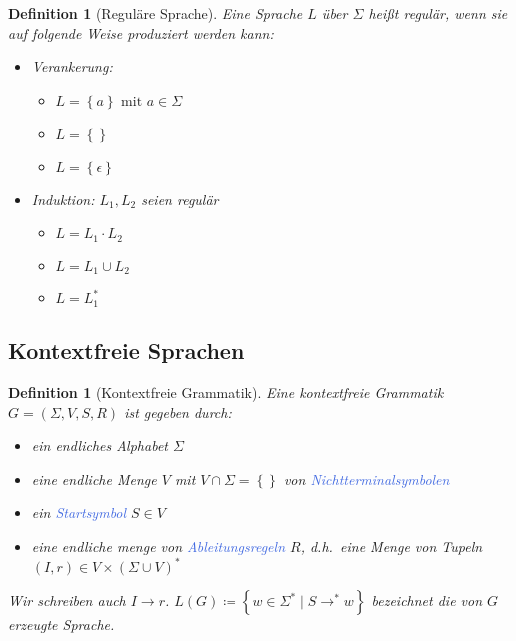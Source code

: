 \documentclass[11pt]{article}
\newcommand{\tcol}[1]{\textcolor{RoyalBlue}{#1}}
\newcommand{\set}[1]{\left\lbrace #1\right\rbrace}
\theoremstyle{break}
\newtheorem{defi}[satz]{Definition}
\begin{document}
    \begin{defi}[Reguläre Sprache]
        Eine Sprache $L$ über $\Sigma$ heißt regulär, wenn sie auf folgende Weise produziert werden kann:
        \begin{itemize}
            \item Verankerung:
            \begin{itemize}
                \item $L=\set{a}\text{ mit } a\in\Sigma$
                \item $L=\set{}$
                \item $L=\set{\epsilon}$
            \end{itemize}
            \item Induktion: $L_1,L_2$ seien regulär
            \begin{itemize}
                \item $L=L_1\cdot L_2$
                \item $L=L_1\cup L_2$
                \item $L=L_1^*$
            \end{itemize}
        \end{itemize}
    \end{defi}


    \subsection{Kontextfreie Sprachen}
	\label{subsec:kontextfreie-sprachenindex}

    \begin{defi}[Kontextfreie Grammatik]
        Eine kontextfreie Grammatik $G=(\Sigma ,V,S,R)$ ist gegeben durch:
        \begin{itemize}
            \item ein endliches Alphabet $\Sigma$
            \item eine endliche Menge $V$ mit $V\cap\Sigma = \set{}$ von \tcol{Nichtterminalsymbolen}
            \item ein \tcol{Startsymbol} $S\in V$
            \item eine endliche menge von \tcol{Ableitungsregeln} $R$, d.h.\ eine Menge von Tupeln $(I,r)\in V\times (\Sigma\cup V)^*$
        \end{itemize}
        Wir schreiben auch $I\rightarrow r$. $L(G)\coloneqq \set{w\in\Sigma^*\mid S\rightarrow^*w}$ bezeichnet die von $G$ erzeugte Sprache.
    \end{defi}
\end{document}
